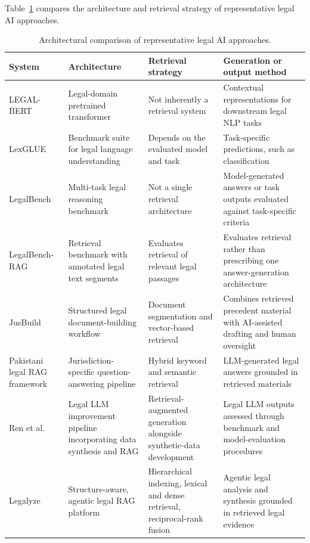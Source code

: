 Table~\ref{tab:arch8} compares the architecture and retrieval strategy of representative legal AI
approaches.

\begin{table}[tp]
\centering
\caption{Architectural comparison of representative legal AI approaches.}
\label{tab:arch8}
\footnotesize
\setlength{\tabcolsep}{5pt}
\renewcommand{\arraystretch}{1.3}
\begin{tabularx}{\textwidth}{>{\raggedright\arraybackslash}p{2.8cm} >{\raggedright\arraybackslash}X >{\raggedright\arraybackslash}X >{\raggedright\arraybackslash}X}
\toprule
\textbf{System} & \textbf{Architecture} & \textbf{Retrieval strategy} & \textbf{Generation or output method} \\
\midrule
LEGAL-BERT \citep{chalkidis2020} & Legal-domain pretrained transformer & Not inherently a retrieval system & Contextual representations for downstream legal NLP tasks \\
LexGLUE \citep{chalkidis2022} & Benchmark suite for legal language understanding & Depends on the evaluated model and task & Task-specific predictions, such as classification \\
LegalBench \citep{guha2023} & Multi-task legal reasoning benchmark & Not a single retrieval architecture & Model-generated answers or task outputs evaluated against task-specific criteria \\
LegalBench-RAG \citep{pipitone2024} & Retrieval benchmark with annotated legal text segments & Evaluates retrieval of relevant legal passages & Evaluates retrieval rather than prescribing one answer-generation architecture \\
JusBuild \citep{buffa2025} & Structured legal document-building workflow & Document segmentation and vector-based retrieval & Combines retrieved precedent material with AI-assisted drafting and human oversight \\
Pakistani legal RAG framework \citep{ref312025} & Jurisdiction-specific question-answering pipeline & Hybrid keyword and semantic retrieval & LLM-generated legal answers grounded in retrieved materials \\
Ren et al.\ \citep{ren2026} & Legal LLM improvement pipeline incorporating data synthesis and RAG & Retrieval-augmented generation alongside synthetic-data development & Legal LLM outputs assessed through benchmark and model-evaluation procedures \\
Legalyze \citep{hamza2026} & Structure-aware, agentic legal RAG platform & Hierarchical indexing, lexical and dense retrieval, reciprocal-rank fusion & Agentic legal analysis and synthesis grounded in retrieved legal evidence \\
\bottomrule
\end{tabularx}
\end{table}

